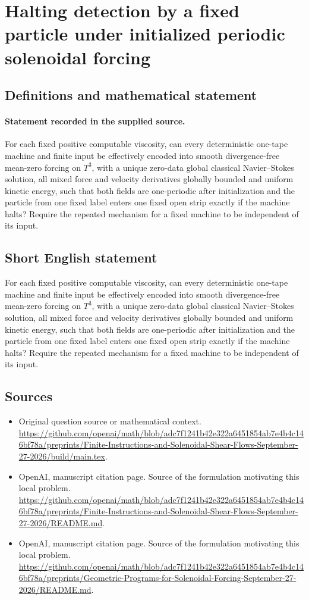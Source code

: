 \documentclass[11pt]{article}
\begin{document}
\section*{Halting detection by a fixed particle under initialized periodic solenoidal forcing}\label{statement}
\subsection{Definitions and mathematical statement}
\paragraph{Statement recorded in the supplied source.}
For each fixed positive computable viscosity, can every deterministic one-tape machine and finite input be effectively encoded into smooth divergence-free mean-zero forcing on $T^3$, with a unique zero-data global classical Navier–Stokes solution, all mixed force and velocity derivatives globally bounded and uniform kinetic energy, such that both fields are one-periodic after initialization and the particle from one fixed label enters one fixed open strip exactly if the machine halts? Require the repeated mechanism for a fixed machine to be independent of its input.
\subsection{Short English statement}
For each fixed positive computable viscosity, can every deterministic one-tape machine and finite input be effectively encoded into smooth divergence-free mean-zero forcing on $T^3$, with a unique zero-data global classical Navier–Stokes solution, all mixed force and velocity derivatives globally bounded and uniform kinetic energy, such that both fields are one-periodic after initialization and the particle from one fixed label enters one fixed open strip exactly if the machine halts? Require the repeated mechanism for a fixed machine to be independent of its input.
\subsection{Sources}
\begin{itemize}
\item[S1] Original question source or mathematical context.
\url{https://github.com/openai/math/blob/adc7f1241b42e322a6451854ab7e4b4c146bf78a/preprints/Finite-Instructions-and-Solenoidal-Shear-Flows-September-27-2026/build/main.tex}.
\item[S2] OpenAI, manuscript citation page. Source of the formulation motivating this local problem.
\url{https://github.com/openai/math/blob/adc7f1241b42e322a6451854ab7e4b4c146bf78a/preprints/Finite-Instructions-and-Solenoidal-Shear-Flows-September-27-2026/README.md}.
\item[S3] OpenAI, manuscript citation page. Source of the formulation motivating this local problem.
\url{https://github.com/openai/math/blob/adc7f1241b42e322a6451854ab7e4b4c146bf78a/preprints/Geometric-Programs-for-Solenoidal-Forcing-September-27-2026/README.md}.
\end{itemize}
\end{document}
